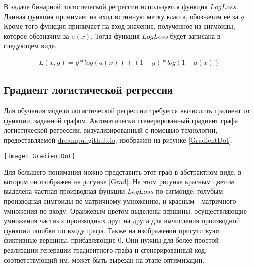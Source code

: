 В задаче бинарной логистической регрессии используется функция $LogLoss$. Данная функция принимает на вход истинную метку класса, обозначим её за $g$. Кроме того функция принимает на вход значение, полученное из сигмоиды, которое обозначим за $a(x)$. Тогда функция $LogLoss$ будет записана в следующем виде.

\begin{gather*}
L(x, g)=g*log(a(x)) + (1-g)*log(1-a(x))
\end{gather*}

\subsection{Градиент логистической регрессии}

Для обучения модели логистической регрессии требуется вычислить градиент от функции, заданной графом. Автоматически сгенерированный градиент графа логистической регрессии, визуализированный с помощью технологии, предоставляемой \href{https://dreampuf.github.io/GraphvizOnline}{dreampuf.github.io}, изображен на рисунке \ref{GradientDot}.

\begin{sidewaysfigure}
    \centering
    \texttt{[image: GradientDot]}
    \caption{Градиентный граф, визуализированный с помощью \href{https://dreampuf.github.io/GraphvizOnline}{dreampuf.github.io}}
    \label{GradientDot}
\end{sidewaysfigure}


\clearpage
Для большего понимания можно представить этот граф в абстрактном виде, в котором он изображен на рисунке \ref{Grad}. На этом рисунке красным цветом выделена частная производная функции $LogLoss$ по сигмоиде, голубым - производная симгоиды по матричному умножению, и красным - матричного умножения по входу. Оранжевым цветом выделены вершины, осуществляющие умножения частных производных друг на друга для вычисления производной функции ошибки по входу графа. Также на изображении присутствуют фиктивные вершины, прибавляющие $0$. Они нужны для более простой реализации генерации градиентного графа и сгенерированный код, соответствующий им, может быть вырезан на этапе оптимизации.

